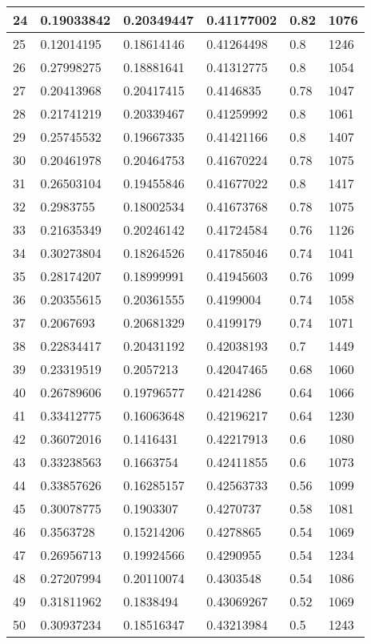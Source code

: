 \begin{longtable}{|l|l|l|l|l|l|}
24 & 0.19033842 & 0.20349447 & 0.41177002 & 0.82 & 1076 \\ \hline 
25 & 0.12014195 & 0.18614146 & 0.41264498 & 0.8 & 1246 \\ \hline 
26 & 0.27998275 & 0.18881641 & 0.41312775 & 0.8 & 1054 \\ \hline 
27 & 0.20413968 & 0.20417415 & 0.4146835 & 0.78 & 1047 \\ \hline 
28 & 0.21741219 & 0.20339467 & 0.41259992 & 0.8 & 1061 \\ \hline 
29 & 0.25745532 & 0.19667335 & 0.41421166 & 0.8 & 1407 \\ \hline 
30 & 0.20461978 & 0.20464753 & 0.41670224 & 0.78 & 1075 \\ \hline 
31 & 0.26503104 & 0.19455846 & 0.41677022 & 0.8 & 1417 \\ \hline 
32 & 0.2983755 & 0.18002534 & 0.41673768 & 0.78 & 1075 \\ \hline 
33 & 0.21635349 & 0.20246142 & 0.41724584 & 0.76 & 1126 \\ \hline 
34 & 0.30273804 & 0.18264526 & 0.41785046 & 0.74 & 1041 \\ \hline 
35 & 0.28174207 & 0.18999991 & 0.41945603 & 0.76 & 1099 \\ \hline 
36 & 0.20355615 & 0.20361555 & 0.4199004 & 0.74 & 1058 \\ \hline 
37 & 0.2067693 & 0.20681329 & 0.4199179 & 0.74 & 1071 \\ \hline 
38 & 0.22834417 & 0.20431192 & 0.42038193 & 0.7 & 1449 \\ \hline 
39 & 0.23319519 & 0.2057213 & 0.42047465 & 0.68 & 1060 \\ \hline 
40 & 0.26789606 & 0.19796577 & 0.4214286 & 0.64 & 1066 \\ \hline 
41 & 0.33412775 & 0.16063648 & 0.42196217 & 0.64 & 1230 \\ \hline 
42 & 0.36072016 & 0.1416431 & 0.42217913 & 0.6 & 1080 \\ \hline 
43 & 0.33238563 & 0.1663754 & 0.42411855 & 0.6 & 1073 \\ \hline 
44 & 0.33857626 & 0.16285157 & 0.42563733 & 0.56 & 1099 \\ \hline 
45 & 0.30078775 & 0.1903307 & 0.4270737 & 0.58 & 1081 \\ \hline 
46 & 0.3563728 & 0.15214206 & 0.4278865 & 0.54 & 1069 \\ \hline 
47 & 0.26956713 & 0.19924566 & 0.4290955 & 0.54 & 1234 \\ \hline 
48 & 0.27207994 & 0.20110074 & 0.4303548 & 0.54 & 1086 \\ \hline 
49 & 0.31811962 & 0.1838494 & 0.43069267 & 0.52 & 1069 \\ \hline 
50 & 0.30937234 & 0.18516347 & 0.43213984 & 0.5 & 1243 \\ \hline 
\end{longtable}